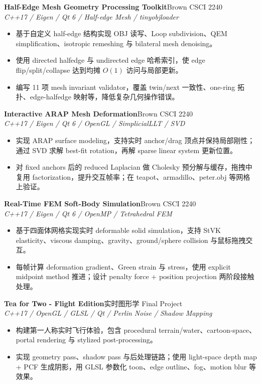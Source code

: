 \documentclass[10pt,fontset=none]{ctexart}
\newcommand{\project}[3]{\textbf{#1}\hfill #2\\\textit{#3}}
\begin{document}
\project{Half-Edge Mesh Geometry Processing Toolkit}{Brown CSCI 2240}{C++17 / Eigen / Qt 6 / Half-edge Mesh / tinyobjloader}
\begin{itemize}
  \item 基于自定义 half-edge 结构实现 OBJ 读写、Loop subdivision、QEM simplification、isotropic remeshing 与 bilateral mesh denoising。
  \item 使用 directed halfedge 与 undirected edge 哈希索引，使 edge flip/split/collapse 达到均摊 $O(1)$ 访问与局部更新。
  \item 编写 11 项 mesh invariant validator，覆盖 twin/next 一致性、one-ring 拓扑、edge-halfedge 映射等，降低复杂几何操作错误。
\end{itemize}

\project{Interactive ARAP Mesh Deformation}{Brown CSCI 2240}{C++17 / Eigen / Qt 6 / OpenGL / SimplicialLLT / SVD}
\begin{itemize}
  \item 实现 ARAP surface modeling，支持实时 anchor/drag 顶点并保持局部刚性；通过 SVD 求解 best-fit rotation，再解 sparse linear system 更新位置。
  \item 对 fixed anchors 后的 reduced Laplacian 做 Cholesky 预分解与缓存，拖拽中复用 factorization，提升交互帧率；在 teapot、armadillo、peter.obj 等网格上验证。
\end{itemize}

\project{Real-Time FEM Soft-Body Simulation}{Brown CSCI 2240}{C++17 / Eigen / Qt 6 / OpenMP / Tetrahedral FEM}
\begin{itemize}
  \item 基于四面体网格实现实时 deformable solid simulation，支持 StVK elasticity、viscous damping、gravity、ground/sphere collision 与鼠标拖拽交互。
  \item 每帧计算 deformation gradient、Green strain 与 stress，使用 explicit midpoint method 推进；设计 penalty force + position projection 两阶段接触处理。
\end{itemize}

\project{Tea for Two - Flight Edition}{实时图形学 Final Project}{C++17 / OpenGL / GLSL / Qt / Perlin Noise / Shadow Mapping}
\begin{itemize}
  \item 构建第一人称实时飞行体验，包含 procedural terrain/water、cartoon-space、portal rendering 与 stylized post-processing。
  \item 实现 geometry pass、shadow pass 与后处理链路；使用 light-space depth map + PCF 生成阴影，用 GLSL 参数化 toon、edge outline、fog、motion blur 等效果。
\end{itemize}
\end{document}
